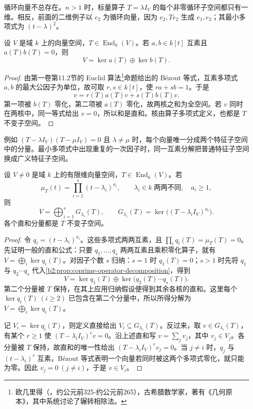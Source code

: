 循环向量不总存在。\(n>1\) 时，标量算子 \(T=\lambda I_V\) 的每个非零循环子空间都只有一维。相反，前面的二维例子以 \(e_2\) 为循环向量，因为 \(e_2,Te_2\) 生成 \(e_1,e_2\)；其最小多项式为 \((t-\lambda)^2\)。

\begin{proposition}[互素多项式给出的分解]\label{b2:prop:coprime-operator-decomposition}
	设 \(V\) 是域 \(k\) 上的向量空间，\(T\in\operatorname{End}_k(V)\)。若 \(a,b\in k[t]\) 互素且 \(a(T)b(T)=0\)，则
	\[
		V=\ker a(T)\oplus\ker b(T).
	\]
\end{proposition}
\begin{proof}
	由第一卷第11.2节的 Euclid 算法\footnote{欧几里得（，约公元前325-约公元前265），古希腊数学家，著有《几何原本》，其中系统讨论了辗转相除法。}命题给出的 Bézout 等式，互素多项式 \(a,b\) 的最大公因子为单位，故可取 \(r,s\in k[t]\)，使 \(ra+sb=1\)。于是
	\[
		v=r(T)a(T)v+s(T)b(T)v.
	\]
	第一项被 \(b(T)\) 零化，第二项被 \(a(T)\) 零化，故两核之和为全空间。若 \(v\) 同时在两核中，同一等式给出 \(v=0\)，所以和是直和。核由算子多项式定义，也都是 \(T\) 不变子空间。
\end{proof}

例如 \((T-\lambda I_V)(T-\mu I_V)=0\) 且 \(\lambda\ne\mu\) 时，每个向量唯一分成两个特征子空间中的分量。最小多项式中出现重复的一次因子时，同一互素分解把普通特征子空间换成广义特征子空间。

\begin{corollary}\label{b2:cor:generalized-eigenspace-decomposition}
	设 \(V\ne0\) 是域 \(k\) 上的有限维向量空间，\(T\in\operatorname{End}_k(V)\)。若
	\[
		\mu_T(t)=\prod_{i=1}^s(t-\lambda_i)^{a_i}, \qquad \lambda_i\in k\;\text{两两不同},\quad a_i\ge1,
	\]
	则
	\[
		V=\bigoplus_{i=1}^sG_{\lambda_i}(T),\qquad G_{\lambda_i}(T)=\ker\bigl((T-\lambda_iI_V)^{a_i}\bigr).
	\]
	各个直和分量都是 \(T\) 不变子空间。
\end{corollary}
\begin{proof}
	令 \(q_i=(t-\lambda_i)^{a_i}\)。这些多项式两两互素，且 \(\prod_iq_i(T)=\mu_T(T)=0\)。先证明一般的直和公式：只要 \(q_1,\ldots,q_s\) 两两互素且乘积零化算子，就有 \(V=\bigoplus_i\ker q_i(T)\)。对因子个数 \(s\) 归纳：\(s=1\) 时 \(q_1(T)=0\)；\(s>1\) 时先将 \(q_1\) 与 \(q_2\cdots q_s\) 代入\cref{b2:prop:coprime-operator-decomposition}，得到
	\[
		V=\ker q_1(T)\oplus\ker\bigl(q_2(T)\cdots q_s(T)\bigr).
	\]
	第二个分量被 \(T\) 保持，在其上应用归纳假设便得到其余各核的直和。这里每个 \(\ker q_i(T)\ (i\ge2)\) 已包含在第二个分量中，所以所得分解为 \(V=\bigoplus_i\ker q_i(T)\)。

	记 \(V_i=\ker q_i(T)\)，则定义直接给出 \(V_i\subseteq G_{\lambda_i}(T)\)。反过来，取 \(v\in G_{\lambda_i}(T)\)，有某个 \(r\ge1\) 使 \((T-\lambda_iI_V)^rv=0\)。沿上述直和写 \(v=\sum_jv_j\)，其中 \(v_j\in V_j\)。各分量被 \(T\) 保持，故直和的唯一性给出 \((T-\lambda_iI_V)^rv_j=0\)。当 \(j\ne i\) 时，\(q_j\) 与 \((t-\lambda_i)^r\) 互素，Bézout 等式表明一个向量若同时被这两个多项式零化，就只能为零。因此 \(v_j=0\ (j\ne i)\)，于是 \(v\in V_i\)。
\end{proof}

